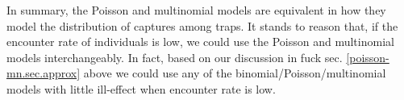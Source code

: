 In summary, the Poisson and multinomial models are equivalent in how
they model the distribution of captures among traps.
 It stands to reason that, if the encounter
rate of individuals is low, we could use the Poisson and multinomial
models interchangeably. In fact, based on our discussion in fuck sec.
\ref{poisson-mn.sec.approx}
above we could use any of the binomial/Poisson/multinomial models with
little ill-effect when encounter rate is low. 





